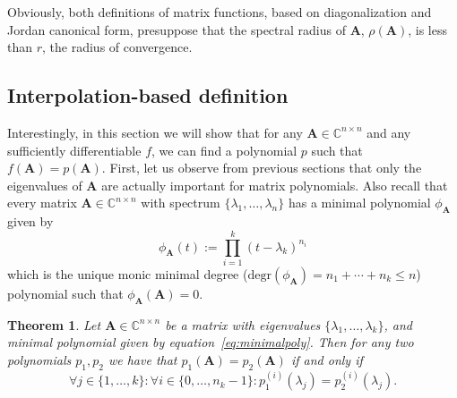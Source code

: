 \documentclass[11pt]{article}
\newtheorem{theorem}{Theorem}[section]
\numberwithin{equation}{section}
\begin{document}
Obviously, both definitions of matrix functions, based on diagonalization and Jordan canonical form, presuppose that the spectral radius of $\mathbf{A}$, $\rho(\mathbf{A})$, is less than $r$, the radius of convergence.
\subsection{Interpolation-based definition}
Interestingly, in this section we will show that for any $\mathbf{A}\in\mathbb{C}^{n\times n}$ and any sufficiently differentiable $f$, we can find a polynomial $p$ such that $f(\mathbf{A})=p(\mathbf{A})$. First, let us observe from previous sections that only the eigenvalues of $\mathbf{A}$ are actually important for matrix polynomials. Also recall that every matrix $\mathbf{A}\in\mathbb{C}^{n\times n}$ with spectrum $\{\lambda_1,\dots,\lambda_n\}$ has a minimal polynomial $\phi_{\mathbf{A}}$ given by
\begin{equation}\label{eq:minimalpoly}
\phi_{\mathbf{A}}(t):=\prod_{i=1}^{k}(t-\lambda_k)^{n_i}
\end{equation}
which is the unique monic minimal degree ($\text{degr}(\phi_{\mathbf{A}})=n_1+\cdots+n_k\leq n$) polynomial such that $\phi_{\mathbf{A}}(\mathbf{A})=0$.
\begin{theorem}\label{thm:unicity}
Let $\mathbf{A}\in \mathbb{C}^{n\times n}$ be a matrix with eigenvalues $\{\lambda_1,\ldots,\lambda_k\}$, and minimal polynomial given by equation~\ref{eq:minimalpoly}. Then for any two polynomials $p_1,p_2$ we have that $p_1(\mathbf{A})=p_2(\mathbf{A})$ if and only if 
$$\forall j\in\{1,\ldots,k\}:\forall i\in\{0,\ldots,n_k-1\}: p_1^{(i)}(\lambda_j)=p_2^{(i)}(\lambda_j).$$
\end{theorem}
\end{document}
